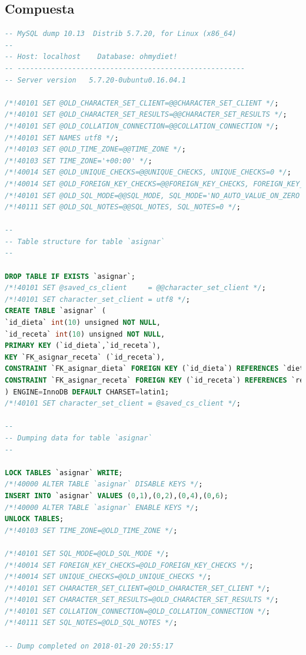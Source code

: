 \documentclass[12pt,letterpaper]{article}
\begin{document}
\subsection{Compuesta}
\begin{lstlisting}[language=sql]
-- MySQL dump 10.13  Distrib 5.7.20, for Linux (x86_64)
--
-- Host: localhost    Database: ohmydiet!
-- ------------------------------------------------------
-- Server version	5.7.20-0ubuntu0.16.04.1

/*!40101 SET @OLD_CHARACTER_SET_CLIENT=@@CHARACTER_SET_CLIENT */;
/*!40101 SET @OLD_CHARACTER_SET_RESULTS=@@CHARACTER_SET_RESULTS */;
/*!40101 SET @OLD_COLLATION_CONNECTION=@@COLLATION_CONNECTION */;
/*!40101 SET NAMES utf8 */;
/*!40103 SET @OLD_TIME_ZONE=@@TIME_ZONE */;
/*!40103 SET TIME_ZONE='+00:00' */;
/*!40014 SET @OLD_UNIQUE_CHECKS=@@UNIQUE_CHECKS, UNIQUE_CHECKS=0 */;
/*!40014 SET @OLD_FOREIGN_KEY_CHECKS=@@FOREIGN_KEY_CHECKS, FOREIGN_KEY_CHECKS=0 */;
/*!40101 SET @OLD_SQL_MODE=@@SQL_MODE, SQL_MODE='NO_AUTO_VALUE_ON_ZERO' */;
/*!40111 SET @OLD_SQL_NOTES=@@SQL_NOTES, SQL_NOTES=0 */;

--
-- Table structure for table `asignar`
--

DROP TABLE IF EXISTS `asignar`;
/*!40101 SET @saved_cs_client     = @@character_set_client */;
/*!40101 SET character_set_client = utf8 */;
CREATE TABLE `asignar` (
`id_dieta` int(10) unsigned NOT NULL,
`id_receta` int(10) unsigned NOT NULL,
PRIMARY KEY (`id_dieta`,`id_receta`),
KEY `FK_asignar_receta` (`id_receta`),
CONSTRAINT `FK_asignar_dieta` FOREIGN KEY (`id_dieta`) REFERENCES `dieta` (`id_dieta`),
CONSTRAINT `FK_asignar_receta` FOREIGN KEY (`id_receta`) REFERENCES `receta` (`id_receta`)
) ENGINE=InnoDB DEFAULT CHARSET=latin1;
/*!40101 SET character_set_client = @saved_cs_client */;

--
-- Dumping data for table `asignar`
--

LOCK TABLES `asignar` WRITE;
/*!40000 ALTER TABLE `asignar` DISABLE KEYS */;
INSERT INTO `asignar` VALUES (0,1),(0,2),(0,4),(0,6);
/*!40000 ALTER TABLE `asignar` ENABLE KEYS */;
UNLOCK TABLES;
/*!40103 SET TIME_ZONE=@OLD_TIME_ZONE */;

/*!40101 SET SQL_MODE=@OLD_SQL_MODE */;
/*!40014 SET FOREIGN_KEY_CHECKS=@OLD_FOREIGN_KEY_CHECKS */;
/*!40014 SET UNIQUE_CHECKS=@OLD_UNIQUE_CHECKS */;
/*!40101 SET CHARACTER_SET_CLIENT=@OLD_CHARACTER_SET_CLIENT */;
/*!40101 SET CHARACTER_SET_RESULTS=@OLD_CHARACTER_SET_RESULTS */;
/*!40101 SET COLLATION_CONNECTION=@OLD_COLLATION_CONNECTION */;
/*!40111 SET SQL_NOTES=@OLD_SQL_NOTES */;

-- Dump completed on 2018-01-20 20:55:17

\end{lstlisting}
\end{document}

